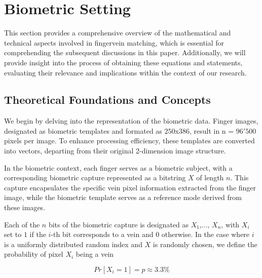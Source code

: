 \section{Biometric Setting}

This section provides a comprehensive overview of the mathematical and technical aspects involved in fingervein matching, which is essential for comprehending the subsequent discussions in this paper. Additionally, we will provide insight into the process of obtaining these equations and statements, evaluating their relevance and implications within the context of our research. 


\subsection{Theoretical Foundations and Concepts}

We begin by delving into the representation of the biometric data. Finger images, designated as biometric templates and formated as \(250\)x\(386\), result in n = \(96'500\) pixels per image. To enhance processing efficiency, these templates are converted into vectors, departing from their original 2-dimension image structure. 

In the biometric context, each finger serves as a biometric subject, with a corresponding biometric capture represented as a bitstring \(X\) of length \(n\). This capture encapsulates the specific vein pixel information extracted from the finger image, while the biometric template serves as a reference mode derived from these images. 

Each of the \(n\) bits of the biometric capture is designated as \(X_1\),..., \(X_n\), with \(X_i\) set to \(1\) if the \(i\)-th bit corresponds to a vein and \(0\) otherwise. In the case where \(i\) is a uniformly distributed random index and \(X\) is randomly chosen, we define the probability of pixel \(X_i\) being a vein 

\begin{equation} \label{eq:proba}
    Pr[X_i = 1] = p \approx 3.3 \% 
\end{equation}

